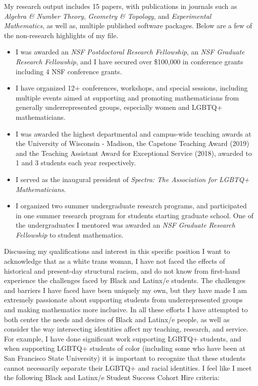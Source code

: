 \documentclass[11pt]{article}
\begin{document}
My research output includes 15 papers, with publications in journals such as \textit{Algebra \& Number Theory}, \textit{Geometry \& Topology}, and \textit{Experimental Mathematics}, as well as, multiple published software packages. Below are a few of the non-research highlights of my file.

\begin{itemize}[leftmargin=*]
\item I was awarded an \textit{NSF Postdoctoral Research Fellowship}, an \textit{NSF Graduate Research Fellowship}, and I have secured over \$100,000 in conference grants including 4 NSF conference grants. 
\item I have organized 12+ conferences, workshops, and special sessions, including multiple events aimed at supporting and promoting mathematicians from generally underrepresented groups, especially women and LGBTQ+ mathematicians. 
\item I was awarded the highest departmental and campus-wide teaching awards at the University of Wisconsin - Madison, the Capstone Teaching Award (2019) and the Teaching Assistant Award for Exceptional Service (2018), awarded to 1 and 3 students each year respectively. 
\item I served as the inaugural president of \textit{Spectra: The Association for LGBTQ+ Mathematicians}.
\item I organized two summer undergraduate research programs, and participated in one summer research program for students starting graduate school. One of the undergraduates I mentored was awarded an \textit{NSF Graduate Research Fellowship} to student mathematics.  
\end{itemize}

Discussing my qualifications and interest in this specific position I want to acknowledge that as a white trans woman, I have not faced the effects of historical and present-day structural racism, and do not know from first-hand experience the challenges faced by Black and Latinx/e students. The challenges and barriers I have faced have been uniquely my own, but they have made I am extremely passionate about supporting students from underrepresented groups and making mathematics more inclusive. In all these efforts I have attempted to both center the needs and desires of Black and Latinx/e people, as well as consider the way intersecting identities affect my teaching, research, and service. For example, I have done significant work supporting LGBTQ+ students, and when supporting LGBTQ+ students of color (including some who have been at San Francisco State University) it is important to recognize that these students cannot necessarily separate their LGBTQ+ and racial identities. I feel like I meet the following Black and Latinx/e Student Success Cohort Hire criteria:
\end{document}
